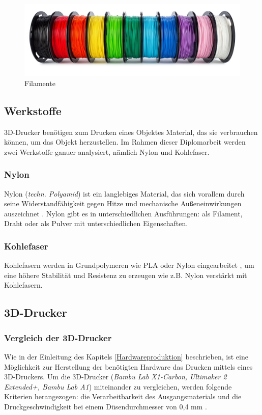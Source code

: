 \begin{figure}[H]
	\centering
	\includegraphics[width=0.5\linewidth]{images/Filamente.jpg}
	\caption[Filamente]{Filamente}
	\label{fig:Kunststoff Filamente}
\end{figure}



\subsection{Werkstoffe}
3D-Drucker benötigen zum Drucken eines Objektes Material, das sie verbrauchen können, um das Objekt herzustellen. Im Rahmen dieser Diplomarbeit werden zwei Werkstoffe ganuer analysiert, nämlich Nylon und Kohlefaser.

\subsubsection{Nylon}
Nylon (\textit{techn. Polyamid}) ist ein langlebiges Material, das sich vorallem durch seine Widerstandfähigkeit gegen Hitze und mechanische Außeneinwirkungen auszeichnet \parencite{Nylon}. Nylon gibt es in unterschiedlichen Ausführungen: als Filament, Draht oder als Pulver mit unterschiedlichen Eigenschaften. 

\subsubsection{Kohlefaser}
Kohlefasern werden in Grundpolymeren wie PLA oder Nylon eingearbeitet \parencite{Kohlefasern}, um eine höhere Stabilität und Resistenz zu erzeugen wie z.B. Nylon verstärkt mit Kohlefasern.\\


\newpage
\subsection{3D-Drucker}

\subsubsection{Vergleich der 3D-Drucker}
Wie in der Einleitung des Kapitels \ref{Hardwareproduktion} beschrieben, ist eine Möglichkeit zur Herstellung der benötigten Hardware das Drucken mittels eines 3D-Druckers. Um die 3D-Drucker (\textit{Bambu Lab X1-Carbon, Ultimaker 2 Extended+, Bambu Lab A1})  \parencite{Ultimaker2ExtendedSpecification} \parencite{BambuLabA1} miteinander zu vergleichen, werden folgende Kriterien herangezogen: die Verarbeitbarkeit des Ausgangsmaterials und die Druckgeschwindigkeit bei einem Düsendurchmesser von 0,4 mm \parencite{BambuLabX1Carbon3DPrinterSpecifications}. 

